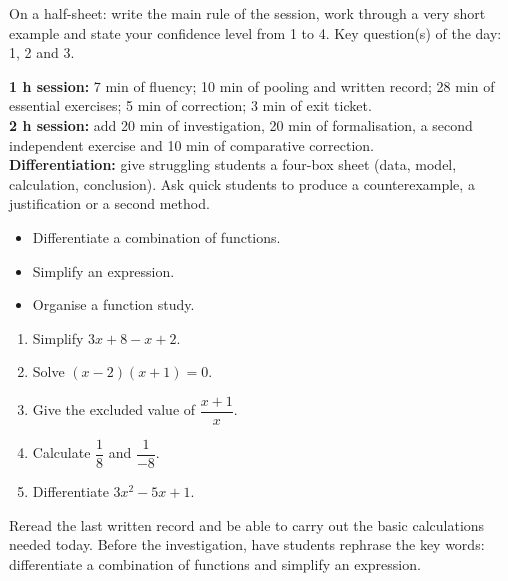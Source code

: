 \begin{sortie}On a half-sheet: write the main rule of the session, work through a very short example and state your confidence level from 1 to 4. Key question(s) of the day: 1, 2 and 3.\end{sortie}

\ifprof
\begin{methode}
\textbf{1 h session:} 7 min of fluency; 10 min of pooling and written record; 28 min of essential exercises; 5 min of correction; 3 min of exit ticket.\\
\textbf{2 h session:} add 20 min of investigation, 20 min of formalisation, a second independent exercise and 10 min of comparative correction.\\
\textbf{Differentiation:} give struggling students a four-box sheet (data, model, calculation, conclusion). Ask quick students to produce a counterexample, a justification or a second method.
\end{methode}
\fi
{}
\begin{objectifs}\begin{itemize}\item Differentiate a combination of functions.\item Simplify an expression.\item Organise a function study.\end{itemize}\end{objectifs}
\begin{automatismes}\begin{enumerate}\item Simplify $3x+8-x+2$. \item Solve $(x-2)(x+1)=0$. \item Give the excluded value of $\dfrac{x+1}{x}$. \item Calculate $\dfrac1{8}$ and $\dfrac1{-8}$. \item Differentiate $3x^2-5x+1$. \end{enumerate}\end{automatismes}
\begin{prerequis}Reread the last written record and be able to carry out the basic calculations needed today. Before the investigation, have students rephrase the key words: differentiate a combination of functions and simplify an expression.\end{prerequis}

